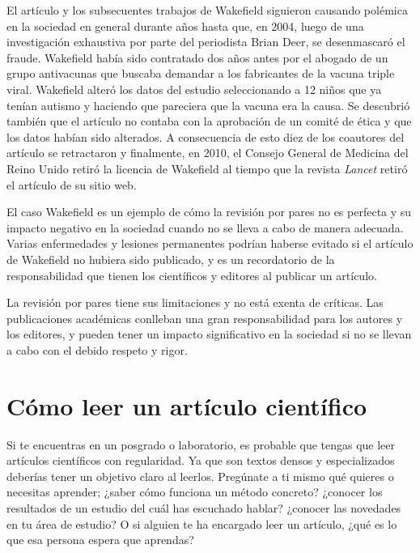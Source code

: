 El artículo y los subsecuentes trabajos de Wakefield siguieron causando polémica
en la sociedad en general durante años hasta que, en 2004, luego de una
investigación exhaustiva por parte del periodista Brian Deer, se desenmascaró el
fraude\cite{Deerc1127}.
Wakefield había sido contratado dos años antes por el abogado de un grupo
antivacunas que buscaba demandar a los fabricantes de la vacuna triple viral.
Wakefield alteró los datos del estudio seleccionando a 12 niños que ya tenían
autismo y haciendo que pareciera que la vacuna era la causa.
Se descubrió también que el artículo no contaba con la aprobación de un comité
de ética y que los datos habían sido alterados.
A consecuencia de esto diez de los coautores del artículo se retractaron y
finalmente, en 2010, el Consejo General de Medicina del Reino Unido retiró la
licencia de Wakefield al tiempo que la revista \emph{Lancet} retiró el artículo
de su sitio web.

El caso Wakefield es un ejemplo de cómo la revisión por pares no es perfecta y
su impacto negativo en la sociedad cuando no se lleva a cabo de manera
adecuada.
Varias enfermedades y lesiones permanentes podrían haberse evitado si el
artículo de Wakefield no hubiera sido publicado, y es un recordatorio de la
responsabilidad que tienen los científicos y editores al publicar un artículo.

\begin{remember}
  La revisión por pares tiene sus limitaciones y no está exenta de críticas.
  Las publicaciones académicas conlleban una gran responsabilidad para los
  autores y los editores, y pueden tener un impacto significativo en la
  sociedad si no se llevan a cabo con el debido respeto y rigor.
\end{remember}

\section{Cómo leer un artículo científico}
\label{sec:comoleer}

Si te encuentras en un posgrado o laboratorio, es probable que tengas que leer
artículos científicos con regularidad.
Ya que son textos densos y especializados deberías tener un objetivo claro al
leerlos.
Pregúnate a ti mismo qué quieres o necesitas aprender; ¿saber cómo funciona un
método concreto? ¿conocer los resultados de un estudio del cuál has escuchado
hablar? ¿conocer las novedades en tu área de estudio? O si alguien te ha
encargado leer un artículo, ¿qué es lo que esa persona espera que aprendas?

